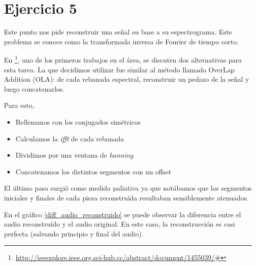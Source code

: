 \documentclass[paper=a4, fontsize=11pt]{scrartcl} %
\numberwithin{equation}{section} %
\numberwithin{figure}{section} %
\numberwithin{table}{section} %
\begin{document}
\newpage


\section{Ejercicio 5}

Este punto nos pide reconstruir una señal en base a su espectrograma. Este problema se conoce como la transformada inversa de Fourier de tiempo corto.

En \footnote{\url{http://ieeexplore.ieee.org.sci-hub.cc/abstract/document/1455039/#}}, uno de los primeros trabajos en el área, se discuten dos alternativas para esta tarea. La que decidimos utilizar fue similar al método llamado OverLap Addition (OLA): de cada rebanada espectral, reconstruir un pedazo de la señal y luego concatenarlos.

Para esto,

\begin{itemize}
    \item Rellenamos con los conjugados simétricos
    \item Calculamos la \emph{ifft} de cada rebanada
    \item Dividimos por una ventana de \emph{hanning}
    \item Concatenamos los distintos segmentos con un offset
\end{itemize}

El último paso surgió como medida paliativa ya que notábamos que los segmentos iniciales y finales de cada pieza reconstruída resultaban sensiblemente atenuados.

En el gráfico \ref{diff_audio_reconstruido} se puede observar la diferencia entre el audio reconstruído y el audio original. En este caso, la reconstrucción es casi perfecta (salvando principio y final del audio).
\end{document}
